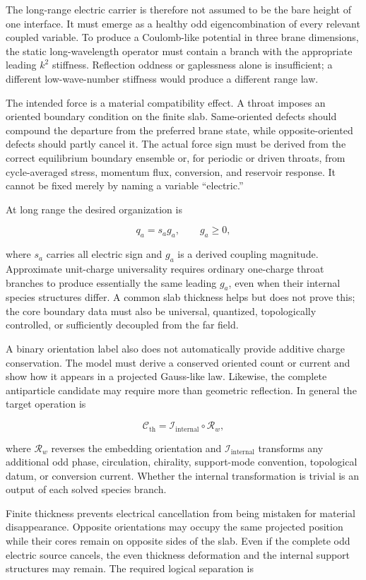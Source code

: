 The long-range electric carrier is therefore not assumed to be the bare height
of one interface. It must emerge as a healthy odd eigencombination of every
relevant coupled variable. To produce a Coulomb-like potential in three brane
dimensions, the static long-wavelength operator must contain a branch with the
appropriate leading \(k^2\) stiffness. Reflection oddness or gaplessness alone
is insufficient; a different low-wave-number stiffness would produce a
different range law.

The intended force is a material compatibility effect. A throat imposes an
oriented boundary condition on the finite slab. Same-oriented defects should
compound the departure from the preferred brane state, while opposite-oriented
defects should partly cancel it. The actual force sign must be derived from the
correct equilibrium boundary ensemble or, for periodic or driven throats, from
cycle-averaged stress, momentum flux, conversion, and reservoir response. It
cannot be fixed merely by naming a variable ``electric.''

At long range the desired organization is

\[
q_a=s_a g_a,
\qquad g_a\ge0,
\]

where \(s_a\) carries all electric sign and \(g_a\) is a derived coupling
magnitude. Approximate unit-charge universality requires ordinary one-charge
throat branches to produce essentially the same leading \(g_a\), even when their
internal species structures differ. A common slab thickness helps but does not
prove this; the core boundary data must also be universal, quantized,
topologically controlled, or sufficiently decoupled from the far field.

A binary orientation label also does not automatically provide additive charge
conservation. The model must derive a conserved oriented count or current and
show how it appears in a projected Gauss-like law. Likewise, the complete
antiparticle candidate may require more than geometric reflection. In general
the target operation is

\[
\mathcal C_{\mathrm{th}}
=
\mathcal I_{\mathrm{internal}}\circ\mathcal R_w,
\]

where \(\mathcal R_w\) reverses the embedding orientation and
\(\mathcal I_{\mathrm{internal}}\) transforms any additional odd phase,
circulation, chirality, support-mode convention, topological datum, or conversion
current. Whether the internal transformation is trivial is an output of each
solved species branch.

Finite thickness prevents electrical cancellation from being mistaken for
material disappearance. Opposite orientations may occupy the same projected
position while their cores remain on opposite sides of the slab. Even if the
complete odd electric source cancels, the even thickness deformation and the
internal support structures may remain. The required logical separation is

